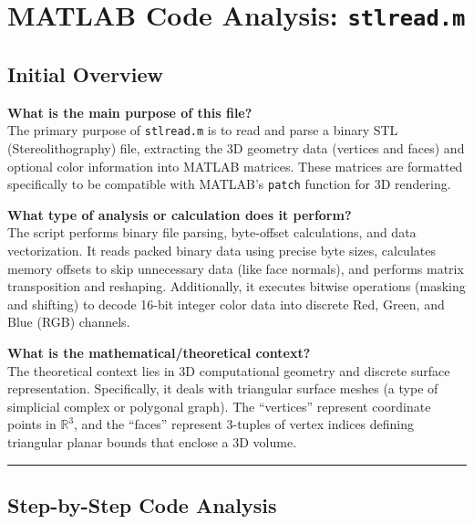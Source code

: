 
\chapter{MATLAB Code Analysis: \texttt{stlread.m}}
\date{}


\maketitle

\section{Initial Overview}

\textbf{What is the main purpose of this file?} \\
The primary purpose of \texttt{stlread.m} is to read and parse a binary STL (Stereolithography) file, extracting the 3D geometry data (vertices and faces) and optional color information into MATLAB matrices. These matrices are formatted specifically to be compatible with MATLAB's \texttt{patch} function for 3D rendering.

\textbf{What type of analysis or calculation does it perform?} \\
The script performs binary file parsing, byte-offset calculations, and data vectorization. It reads packed binary data using precise byte sizes, calculates memory offsets to skip unnecessary data (like face normals), and performs matrix transposition and reshaping. Additionally, it executes bitwise operations (masking and shifting) to decode 16-bit integer color data into discrete Red, Green, and Blue (RGB) channels.

\textbf{What is the mathematical/theoretical context?} \\
The theoretical context lies in 3D computational geometry and discrete surface representation. Specifically, it deals with triangular surface meshes (a type of simplicial complex or polygonal graph). The ``vertices'' represent coordinate points in $\mathbb{R}^3$, and the ``faces'' represent 3-tuples of vertex indices defining triangular planar bounds that enclose a 3D volume. 

\vspace{0.5cm}
\hrule
\vspace{0.5cm}

\section{Step-by-Step Code Analysis}

